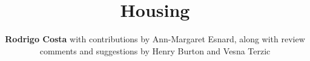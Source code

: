 %
%
%


%
%
%
%
%
%
%
%

\title{Housing}
\author{
    \textbf{Rodrigo Costa}
    with contributions by Ann-Margaret Esnard,
    \newline
    along with review comments and suggestions by Henry Burton and Vesna Terzic
}
\tocauthor{}
%
%
\maketitle

